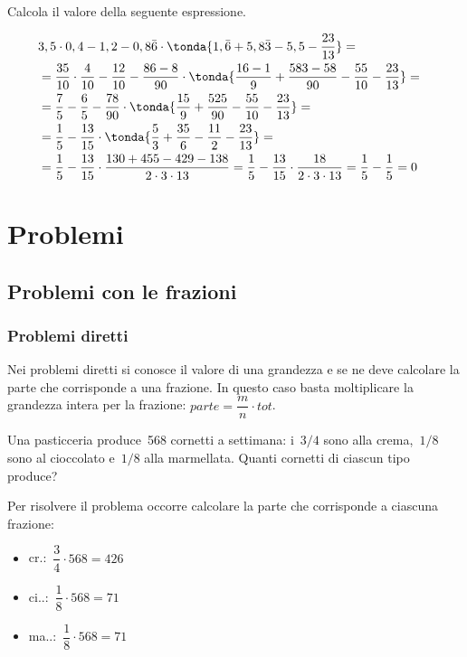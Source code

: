 \begin{esempio}{}{}
Calcola il valore della seguente espressione.
   
\begin{align*}
&3,5 \cdot 0,4-1,2-0,8\bar{6} \cdot \tonda{
   1,\bar{6}+5,8\bar{3}-5,5-\frac{23}{13}
}=&\\
&=\frac{35}{10} \cdot \frac{4}{10}-\frac{12}{10}-
 \frac{86-8}{90} \cdot \tonda{
   \frac{16-1}{9} + \frac{583-58}{90} - \frac{55}{10} - \frac{23}{13}
 }=\\
&=\frac{7}{5}-\frac{6}{5}-
 \frac{78}{90} \cdot \tonda{
   \frac{15}{9} + \frac{525}{90} - \frac{55}{10} - \frac{23}{13}
 }=\\
&=\frac{1}{5}-
 \frac{13}{15} \cdot \tonda{
   \frac{5}{3} + \frac{35}{6} - \frac{11}{2} - \frac{23}{13}
 }=\\
&=\frac{1}{5}-
 \frac{13}{15} \cdot
   \frac{130+455-429-138}{2 \cdot 3 \cdot 13} =
 \frac{1}{5} - \frac{13}{15} \cdot \frac{18}{2 \cdot 3 \cdot 13}=
\frac{1}{5} - \frac{1}{5} = 0
\end{align*}

\end{esempio}


\section{Problemi}
\label{sec:razionali_problemi}


\subsection{Problemi con le frazioni}

\subsubsection{Problemi diretti}
Nei problemi diretti si conosce il valore di una grandezza e se ne deve 
calcolare la parte che corrisponde a una frazione. 
In questo caso basta moltiplicare la grandezza intera per la frazione: 
\quad \(parte = \dfrac{m}{n} \cdot tot\).

 \begin{esempio}{}{}
Una pasticceria produce~568 cornetti a settimana: i~\(3/4\) sono alla 
crema,~\(1/8\) sono al cioccolato e~\(1/8\) alla marmellata. 
Quanti cornetti di ciascun tipo produce?

Per risolvere il problema occorre calcolare la parte che corrisponde a 
ciascuna frazione:

\begin{htmulticols}{3}
\begin{itemize} [noitemsep]
\item cr.:~\(\dfrac{3}{4} \cdot 568 =426\)
\item ci..:~\(\dfrac{1}{8} \cdot 568 =71\)
\item ma..:~\(\dfrac{1}{8} \cdot 568 =71\)
\end{itemize}
\end{htmulticols}
 \end{esempio}



